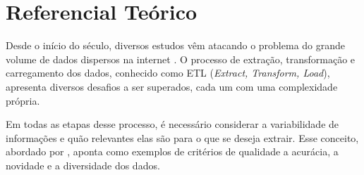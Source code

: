\begin{comment}

## Linha 2 - Engenharia de software e Linguagens de programação

Arquitetura de Software
Engenharia de Software
Engenharia Semiótica
Evolução de Software
Interação Humano-Computador
Linguagem de Programação
Sistemas Colaborativos
Qualidade e Processos de Software

## Linha 3 - Gerenciamento de Dados e Informações

Banco de Dados
Bibliotecas Digitais
Ciência de Dados
Mineração de Dados
Recuperação de Informação
Sistemas de Informação para a Web

## Linha 4 - Robótica, Visão computacional e Processamento gráfico

Visualização de Dados

## Linha 5 - Inteligência artificial

Agentes Inteligentes
Algoritmos Bioinspirados
Aplicações de IA
Aprendizado de Máquina
Aprendizado Profundo
Computação evolutiva
Heurísticas e Metaheurísticas
Inferência
Interpretabilidade
Processamento de Linguagem Natural
Redes Neurais Artificiais

## Linha 6 - Otimização

Algoritmos e Aplicações
Heurísticas

\end{comment}

\section{Referencial Teórico}


Desde o início do século, diversos estudos vêm atacando o problema do grande volume de dados dispersos na internet \cite{2001Alisson, 2002Altigran, 2008Marcelo}. O processo de extração, transformação e carregamento dos dados, conhecido como ETL (\textit{Extract, Transform, Load}), apresenta diversos desafios a ser superados, cada um com uma complexidade própria.

Em todas as etapas desse processo, é necessário considerar a variabilidade de informações e quão relevantes elas são para o que se deseja extrair. Esse conceito, abordado por , aponta como exemplos de critérios de qualidade a acurácia, a novidade e a diversidade dos dados.

